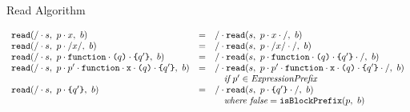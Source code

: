 \documentclass[preprint,10pt]{sigplanconf}
\begin{document}
\begin{displayfigure*}{\label{fig:read}Read Algorithm}
  
\[
  \begin{array}{lcll}
    \texttt{read}(/\cdot s,~p\cdot x,~b)
    &=&
    / \cdot 
      \texttt{read}(s,~
        p\cdot x\cdot /
      ,~b)
   
    \\
    \texttt{read}(/\cdot s,~p \cdot /x/,~b)
    &=&
    / \cdot 
      \texttt{read}(s,~
        p \cdot /x/ \cdot /
      ,~b)
   
    \\
    \texttt{read}(/\cdot s,~p \cdot \texttt{function}\cdot \texttt{(}q\texttt{)}
      \cdot \texttt{\{}q'\texttt{\}},~b)
    &=&
    / \cdot 
      \texttt{read}(s,~
        p \cdot \texttt{function}\cdot \texttt{(}q\texttt{)}
        \cdot \texttt{\{}q'\texttt{\}} \cdot /
      ,~b)
   
    \\
    \texttt{read}(/\cdot s,~
      p \cdot p' \cdot \texttt{function}\cdot \texttt{x} 
      \cdot \texttt{(}q\texttt{)} \cdot \texttt{\{}q'\texttt{\}}
    ,~b)
    &=&
    / \cdot 
      \texttt{read}(s,~
        p \cdot p' \cdot \texttt{function}\cdot \texttt{x} \cdot \texttt{(}q\texttt{)}
        \cdot \texttt{\{}q'\texttt{\}} \cdot /
      ,~b)
   
    \\
    && \quad \textit{if}~p' \in \textit{ExpressionPrefix}
    \\
    \texttt{read}(/\cdot s,~
      p \cdot \texttt{\{}q'\texttt{\}}
    ,~b)
    &=&
    / \cdot 
      \texttt{read}(s,~
        p \cdot \texttt{\{}q'\texttt{\}} \cdot /
      ,~b)
   
    \\
    && \quad \textit{where false} = \texttt{isBlockPrefix}(p,~b)


\end{array}\]
\end{displayfigure*}
\end{document}
